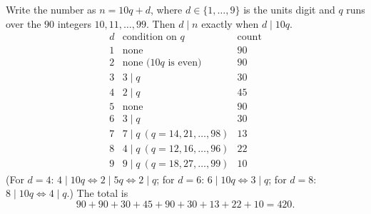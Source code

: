 Write the number as $n=10q+d$, where $d\in\{1,\dots,9\}$ is the units digit and $q$ runs over the $90$ integers $10,11,\dots,99$. Then $d\mid n$ exactly when $d\mid10q$.
\[
\begin{array}{c|l|c}
d & \text{condition on }q & \text{count}\\\hline
1 & \text{none} & 90\\
2 & \text{none ($10q$ is even)} & 90\\
3 & 3\mid q & 30\\
4 & 2\mid q & 45\\
5 & \text{none} & 90\\
6 & 3\mid q & 30\\
7 & 7\mid q\ (q=14,21,\dots,98) & 13\\
8 & 4\mid q\ (q=12,16,\dots,96) & 22\\
9 & 9\mid q\ (q=18,27,\dots,99) & 10
\end{array}
\]
(For $d=4$: $4\mid10q\iff2\mid5q\iff2\mid q$; for $d=6$: $6\mid10q\iff3\mid q$; for $d=8$: $8\mid10q\iff4\mid q$.) The total is
\[
90+90+30+45+90+30+13+22+10=\boxed{420}.
\]
